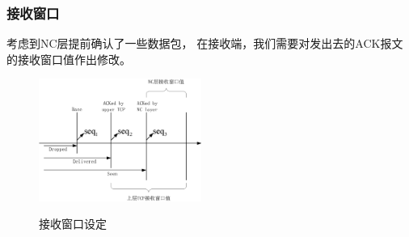 \begin{frame}
	\frametitle{接收窗口}
	考虑到NC层提前确认了一些数据包，
	在接收端，我们需要对发出去的ACK报文的接收窗口值作出修改。
	\begin{figure}
		\includegraphics[height=4cm]{../figures/rcvwnd.eps}
		\label{fig:rcvwnd}
		\caption{接收窗口设定}
	\end{figure}
\end{frame}

